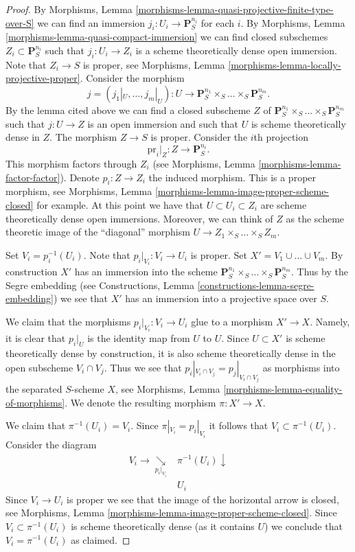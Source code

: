 \begin{proof}
\medskip\noindent
By Morphisms, Lemma \ref{morphisms-lemma-quasi-projective-finite-type-over-S}
we can find an immersion $j_i : U_i \to \mathbf{P}_S^{n_i}$
for each $i$. By
Morphisms, Lemma \ref{morphisms-lemma-quasi-compact-immersion} we can find
closed subschemes $Z_i \subset \mathbf{P}_S^{n_i}$
such that $j_i : U_i \to Z_i$ is a scheme theoretically
dense open immersion. Note that $Z_i \to S$ is proper, see
Morphisms, Lemma \ref{morphisms-lemma-locally-projective-proper}.
Consider the morphism
$$
j = (j_1|_U, \ldots, j_m|_U) : U \longrightarrow
\mathbf{P}_S^{n_1} \times_S \ldots \times_S \mathbf{P}_S^{n_m}.
$$
By the lemma cited above we can find a closed subscheme
$Z$ of $\mathbf{P}_S^{n_1} \times_S \ldots \times_S \mathbf{P}_S^{n_m}$
such that $j : U \to Z$ is an open immersion and such that $U$
is scheme theoretically dense in $Z$. The morphism $Z \to S$
is proper. Consider the $i$th projection
$$
\text{pr}_i|_Z : Z \longrightarrow \mathbf{P}^{n_i}_S.
$$
This morphism factors through $Z_i$ (see Morphisms,
Lemma \ref{morphisms-lemma-factor-factor}). Denote $p_i : Z \to Z_i$
the induced morphism. This is a proper morphism, see
Morphisms, Lemma \ref{morphisms-lemma-image-proper-scheme-closed}
for example. At this point we have that
$U \subset U_i \subset Z_i$ are scheme theoretically
dense open immersions. Moreover, we can think of $Z$ as the
scheme theoretic image of the ``diagonal'' morphism
$U \to Z_1 \times_S \ldots \times_S Z_m$.

\medskip\noindent
Set $V_i = p_i^{-1}(U_i)$. Note that $p_i|_{V_i} : V_i \to U_i$ is proper.
Set $X' = V_1 \cup \ldots \cup V_m$. By construction $X'$ has an immersion
into the scheme
$\mathbf{P}^{n_1}_S \times_S \ldots \times_S \mathbf{P}^{n_m}_S$.
Thus by the Segre embedding (see
Constructions, Lemma \ref{constructions-lemma-segre-embedding})
we see that $X'$ has
an immersion into a projective space over $S$.

\medskip\noindent
We claim that the morphisms $p_i|_{V_i}: V_i \to U_i$ glue to a morphism
$X' \to X$. Namely, it is clear that $p_i|_U$ is the identity map
from $U$ to $U$. Since $U \subset X'$ is scheme theoretically
dense by construction, it is also scheme theoretically dense
in the open subscheme $V_i \cap V_j$. Thus we see that
$p_i|_{V_i \cap V_j} = p_j|_{V_i \cap V_j}$ as morphisms into the
separated $S$-scheme $X$, see
Morphisms, Lemma \ref{morphisms-lemma-equality-of-morphisms}.
We denote the resulting morphism $\pi : X' \to X$.

\medskip\noindent
We claim that $\pi^{-1}(U_i) = V_i$.
Since $\pi|_{V_i} = p_i|_{V_i}$ it follows that
$V_i \subset \pi^{-1}(U_i)$. Consider the diagram
$$
\begin{array}{cc}V_i \longrightarrow\underset{p_i|_{V_i}}{\searrow} & \pi^{-1}(U_i) \downarrow \\  & U_i\end{array}
$$
Since $V_i \to U_i$ is proper we see that the image of
the horizontal arrow is closed, see
Morphisms, Lemma \ref{morphisms-lemma-image-proper-scheme-closed}.
Since $V_i \subset \pi^{-1}(U_i)$ is scheme
theoretically dense (as it contains $U$)
we conclude that $V_i = \pi^{-1}(U_i)$ as claimed.


\end{proof}
